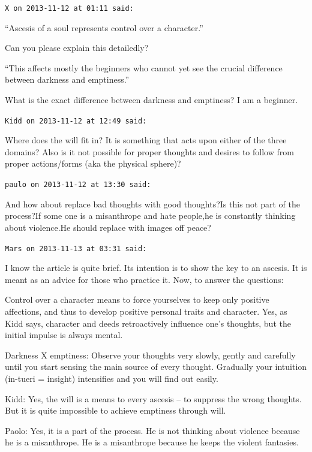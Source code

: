 \begin{footnotesize}\begin{sffamily}



\texttt{X on 2013-11-12 at 01:11 said: }

“Ascesis of a soul represents control over a character.”

Can you please explain this detailedly?

“This affects mostly the beginners who cannot yet see the crucial difference between darkness and emptiness.”

What is the exact difference between darkness and emptiness? I am a beginner.


\hfill

\texttt{Kidd on 2013-11-12 at 12:49 said: }

Where does the will fit in? It is something that acts upon either of the three domains? Also is it not possible for proper thoughts and desires to follow from proper actions/forms (aka the physical sphere)?


\hfill

\texttt{paulo on 2013-11-12 at 13:30 said: }

And how about replace bad thoughts with good thoughts?Is this not part of the process?If some one is a misanthrope and hate people,he is constantly thinking about violence.He should replace with images off peace?


\hfill

\texttt{Mars on 2013-11-13 at 03:31 said: }

I know the article is quite brief. Its intention is to show the key to an ascesis. It is meant as an advice for those who practice it. Now, to answer the questions:

Control over a character means to force yourselves to keep only positive affections, and thus to develop positive personal traits and character. Yes, as Kidd says, character and deeds retroactively influence one's thoughts, but the initial impulse is always mental.

Darkness X emptiness: Observe your thoughts very slowly, gently and carefully until you start sensing the main source of every thought. Gradually your intuition (in-tueri = insight) intensifies and you will find out easily.

Kidd: Yes, the will is a means to every ascesis – to suppress the wrong thoughts. But it is quite impossible to achieve emptiness through will.

Paolo: Yes, it is a part of the process. He is not thinking about violence because he is a misanthrope. He is a misanthrope because he keeps the violent fantasies.



\end{sffamily}
\end{footnotesize}
